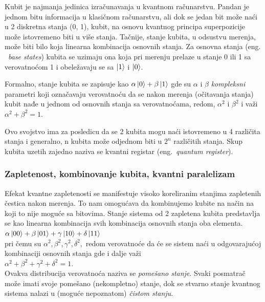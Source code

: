 \documentclass[a4paper]{article}
\begin{document}
{Kubit je najmanja jedinica izračunavanja u kvantnom računarstvu. Pandan je jednom bitu informacija u klasičnom računarstvu, ali dok se jedan bit može naći u 2 diskretna stanja (0, 1),
kubit, na osnovu kvantnog principa superpozicije može istovremeno biti u više stanja.
Tačnije, stanje kubita, u odsustvu merenja, može biti bilo koja linearna kombinacija osnovnih stanja.
Za osnovna stanja (eng. ~\emph{base states}) kubita se uzimaju ona koja pri merenju prelaze u stanje 0 ili 1 sa verovatnoćom 1 i obeležavaju se sa $\ket{1}$ i $\ket{0}$.

Formalno, stanje kubita se zapisuje kao $\alpha \ket{0} + \beta \ket{1}$ gde su $\alpha$ i $\beta$ \emph{kompleksni} parametri koji označavaju verovatnoću da se nakon merenja (očitavanja stanja) kubit nađe u jednom od osnovnih stanja sa verovatnoćama, redom, $\alpha^2$ i $\beta^2$ i važi $\alpha^2+\beta^2=1$.

Ovo svojstvo ima za posledicu da se 2 kubita mogu naći istovremeno u 4 različita stanja i generalno, n kubita može odjednom biti u $2^n$ različitih stanja. Skup kubita uzetih zajedno naziva se kvantni registar (eng.~\emph{quantum register}).

\subsubsection{Zapletenost, kombinovanje kubita, kvantni paralelizam}
\label{entanglement}

Efekat kvantne zapletenosti se manifestuje visoko koreliranim stanjima zapletenih čestica nakon merenja.
To nam omogućava da kombinujemo kubite na način na koji to nije moguće sa bitovima. Stanje sistema od 2 zapletena kubita predstavlja se kao linearna kombinacija svih kombinacija osnovnih stanja oba elementa.\\

$\alpha\ket{00} + \beta\ket{01} + \gamma\ket{10} + \delta\ket{11}$\\

pri čemu su $\alpha^2, \beta^2, \gamma^2, \delta^2,$ redom verovatnoće da će se sistem naći u odgovarajućoj kombinaciji osnovnih stanja gde i dalje važi\\

$\alpha^2+\beta^2+\gamma^2+\delta^2=1$.\\

Ovakva distribucija verovatnoća naziva se \textit{pomešano stanje}\cite{qfc}. Svaki posmatrač može imati svoje pomešano (nekompletno) stanje, dok se stvarno stanje kvantnog sistema nalazi u (moguće nepoznatom) \textit{čistom stanju}.

}
\end{document}
